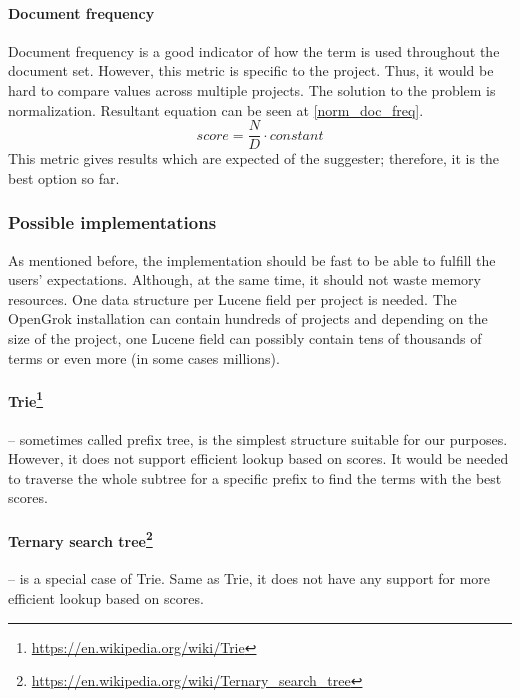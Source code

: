 \paragraph{Document frequency}
Document frequency is a good indicator of how the term is used throughout the document set. However,
this metric is specific to the project. Thus, it would be hard to compare values across multiple projects. The solution
to the problem is normalization. Resultant equation can be seen at \ref{norm_doc_freq}.
\begin{equation}
\label{norm_doc_freq}
score = \frac{N}{D} \cdot constant
\end{equation}
This metric gives results which are expected of the suggester; therefore, it is the best option so far.


\subsubsection{Possible implementations}
\label{possible_implementations}
As mentioned before, the implementation should be fast to be able to fulfill the users' expectations. Although, at the
same time, it should not waste memory resources. One data structure per Lucene field per project is needed. The OpenGrok
installation can contain hundreds of projects and depending on the size of the project, one Lucene field can possibly contain
tens of thousands of terms or even more (in some cases millions).

\paragraph{Trie\protect\footnote{\url{https://en.wikipedia.org/wiki/Trie}}} – sometimes called prefix tree, is the simplest
structure suitable for our purposes. However, it does not support efficient lookup based on scores. It would
be needed to traverse the whole subtree for a specific prefix to find the terms with the best scores.

\paragraph{Ternary search tree\protect\footnote{\url{https://en.wikipedia.org/wiki/Ternary\_search\_tree}}} – is a
special case of Trie. Same as Trie, it does not have any support for more efficient lookup based on scores.

